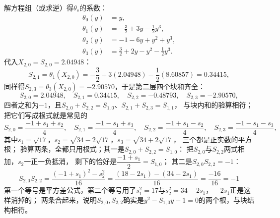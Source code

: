 \documentclass[UTF8,a4paper,11pt]{ctexart}
\begin{document}
解方程组（或求逆）得$\theta_s$的系数：
\begin{align*}
 \theta_0(y)&=y,\\
 \theta_1(y)&=-\frac32+3y-\frac12y^3,\\
 \theta_2(y)&=-1-6y+y^2+y^3,\\
 \theta_3(y)&=\frac32+2y-y^2-\frac12y^3.
\end{align*}
代入$X_{2,0}=S_{2,0}=2.04948$：
\[
 S_{2,1}=\theta_1(X_{2,0})=-\frac32+3(2.04948)-\frac12(8.60857)=0.34415,
\]
同样得$S_{2,3}=\theta_3(X_{2,0})=-2.90570$，于是第二层四个块和齐全：
\[
 S_{2,0}=2.04948,\quad S_{2,1}=0.34415,\quad S_{2,2}=-0.48793,\quad S_{2,3}=-2.90570,
\]
四者之和为$-1$，且$S_{2,0}+S_{2,2}=S_{1,0}$、$S_{2,1}+S_{2,3}=S_{1,1}$，
与块内和的验算相符；把它们写成根式就是常见的
\[
 S_{2,0}=\frac{-1+s_1+s_2}{4},\quad S_{2,1}=\frac{-1-s_1+s_3}{4},\quad
 S_{2,2}=\frac{-1+s_1-s_2}{4},\quad S_{2,3}=\frac{-1-s_1-s_3}{4},
\]
其中$s_1=\sqrt{17}$，$s_2=\sqrt{34-2\sqrt{17}}$，$s_3=\sqrt{34+2\sqrt{17}}$，
三个都是正实数的平方根；
验算两条，全都只用根式；其一是$S_{2,0}+S_{2,2}=S_{1,0}$：
把$S_{2,0}$与$S_{2,2}$两式相加，$s_2$一正一负抵消，
剩下的恰好是$\dfrac{-1+s_1}{2}=S_{1,0}$；
其二是$S_{2,0}S_{2,2}=-1$：
\[
 S_{2,0}S_{2,2}
 =\frac{(-1+s_1)^2-s_2^2}{16}
 =\frac{(18-2s_1)-(34-2s_1)}{16}
 =\frac{-16}{16}=-1
\]
第一个等号是平方差公式，第二个等号用了$s_1^2=17$与$s_2^2=34-2s_1$，
$-2s_1$正是这样消掉的；
两条合起来，说明$S_{2,0},S_{2,2}$确实是$y^2-S_{1,0}y-1=0$的两个根，与块结构相符。\par
\end{document}
